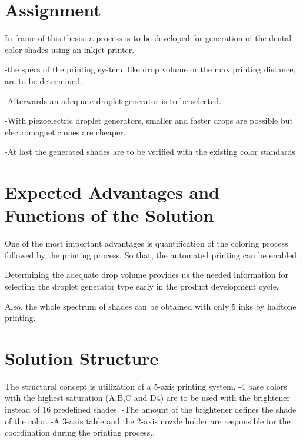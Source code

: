 \cleardoublepage
{}


\chapter{Assignment}
\label{sec:aufgabenstellung}
 In frame of this thesis 
 -a process is to be developed for generation of the dental color shades using an inkjet printer.  
 
 -the specs of the printing system, like drop volume or the max printing distance, are to be determined. 
 
 -Afterwards an adequate droplet generator is to be selected. 
 
 -With piezoelectric droplet generators, smaller and faster drops are possible but electromagnetic ones are cheaper. 
 
 -At last the generated shades are to be verified with the existing color standards
 
 

\chapter{Expected Advantages and Functions of the Solution}
One of the most important advantages is quantification of the coloring process followed by the printing process. 
So that, the automated printing can be enabled. 

Determining the adequate drop volume provides us the needed information for selecting the droplet generator type early in the product development cycle.

Also, the whole spectrum of shades can be obtained with only 5 inks by halftone printing.



\chapter{Solution Structure}
The structural concept is utilization of a 5-axis printing system. 
-4 base colors with the highest saturation (A,B,C and D4) are to be used with the brightener instead of 16 predefined shades. 
-The amount of the brightener defines the shade of the color. 
-A 3-axis table and the 2-axis nozzle holder are responsible for the coordination during the printing process..

